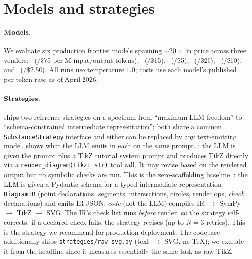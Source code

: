 \section{Models and strategies}
\label{sec:strategies}

\paragraph{Models.}
We evaluate six production frontier models spanning $\sim$$20\times$ in price across three vendors:
\opus\ (/\$75 per M input/output tokens), \sonnet\ (/\$15), \haiku\ (/\$5), \gpt\ (/\$20), \geminipro\ (/\$10), and \geminiflash\ (/\$2.50).
All runs use temperature $1.0$; costs use each model's published per-token rate as of April 2026.

\paragraph{Strategies.}
\GeoGenBench ships two reference strategies on a spectrum from ``maximum LLM freedom'' to ``schema-constrained intermediate representation''; both share a common \texttt{SubstanceStrategy} interface and either can be replaced by any text-emitting model.
 shows what the LLM emits in each on the same prompt.
\textbf{\rawcode}: the LLM is given the prompt plus a TikZ tutorial system prompt and produces TikZ directly via a \texttt{render\_diagram(tikz: str)} tool call.
It may revise based on the rendered output but no symbolic checks are run.
This is the zero-scaffolding baseline.
\textbf{\structured}: the LLM is given a Pydantic schema for a typed intermediate representation \texttt{DiagramIR} (point declarations, segments, intersections, circles, render ops, \emph{check} declarations) and emits IR JSON; \emph{code} (not the LLM) compiles IR $\to$ SymPy $\to$ TikZ $\to$ SVG.
The IR's check list runs \emph{before} render, so the strategy self-corrects: if a declared check fails, the strategy revises (up to $N{=}3$ retries).
This is the strategy we recommend for production deployment.
The codebase additionally ships \texttt{strategies/raw\_svg.py} (text $\to$ SVG, no TeX); we exclude it from the headline since it measures essentially the same task as raw TikZ.

